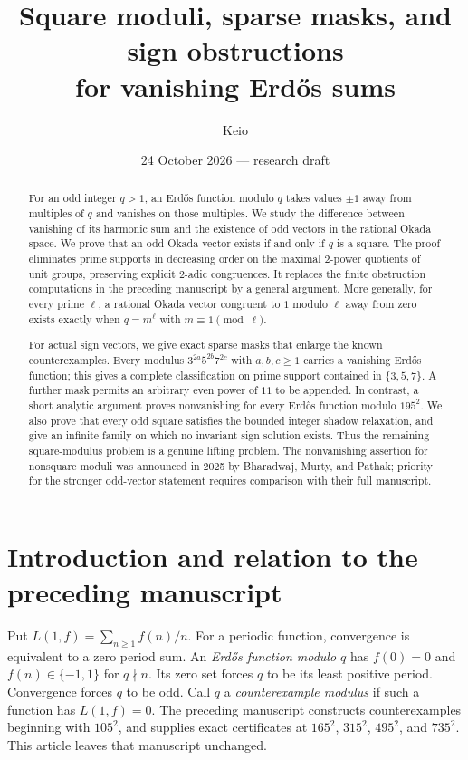 \documentclass[11pt]{amsart}
\theoremstyle{definition}
\theoremstyle{remark}
\numberwithin{equation}{section}
\begin{document}
\title[Square moduli and vanishing Erd\H{o}s sums]{Square moduli, sparse masks, and sign obstructions\\for vanishing Erd\H{o}s sums}
\author{Keio}
\date{24 October 2026 --- research draft}
\begin{abstract}
For an odd integer $q>1$, an Erd\H{o}s function modulo $q$ takes values
$\pm1$ away from multiples of $q$ and vanishes on those multiples.
We study the difference between vanishing of its harmonic sum and the
existence of odd vectors in the rational Okada space.
We prove that an odd Okada vector exists if and only if $q$ is a square.
The proof eliminates prime supports in decreasing order on the maximal
$2$-power quotients of unit groups, preserving explicit $2$-adic congruences.
It replaces the finite obstruction computations in the preceding manuscript
by a general argument. More generally, for every prime $\ell$, a rational
Okada vector congruent to $1$ modulo $\ell$ away from zero exists exactly
when $q=m^\ell$ with $m\equiv1\pmod\ell$.

For actual sign vectors, we give exact sparse masks that enlarge the known
counterexamples. Every modulus $3^{2a}5^{2b}7^{2c}$ with $a,b,c\ge1$
carries a vanishing Erd\H{o}s function; this gives a complete classification
on prime support contained in $\{3,5,7\}$. A further mask permits an arbitrary
even power of $11$ to be appended. In contrast, a short analytic argument
proves nonvanishing for every Erd\H{o}s function modulo $195^2$.
We also prove that every odd square satisfies the bounded integer shadow
relaxation, and give an infinite family on which no invariant sign solution
exists. Thus the remaining square-modulus problem is a genuine lifting
problem. The nonvanishing assertion for nonsquare moduli was announced in
2025 by Bharadwaj, Murty, and Pathak; priority for the stronger odd-vector
statement requires comparison with their full manuscript.
\end{abstract}
\maketitle
\tableofcontents

\section{Introduction and relation to the preceding manuscript}
Put $L(1,f)=\sum_{n\ge1}f(n)/n$. For a periodic function, convergence is
equivalent to a zero period sum. An \emph{Erd\H{o}s function modulo $q$}
has $f(0)=0$ and $f(n)\in\{-1,1\}$ for $q\nmid n$. Its zero set forces
$q$ to be its least positive period. Convergence forces $q$ to be odd.
Call $q$ a \emph{counterexample modulus} if such a function has $L(1,f)=0$.
The preceding manuscript \cite{Keio} constructs counterexamples beginning
with $105^2$, and supplies exact certificates at $165^2$, $315^2$,
$495^2$, and $735^2$. This article leaves that manuscript unchanged.
\end{document}
